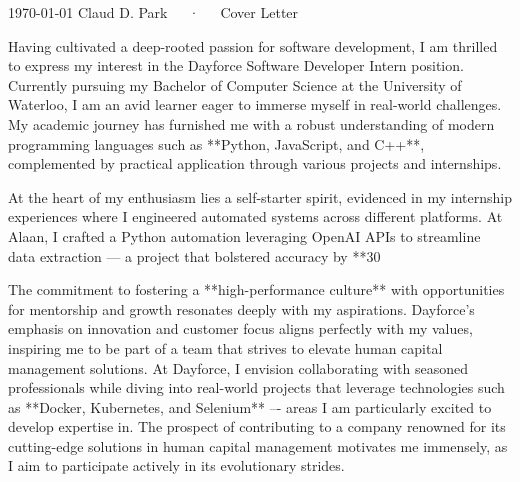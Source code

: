 \documentclass[11pt, a4paper]{awesome-cv}
\begin{document}
\makecvheader[C]

\makecvfooter
  {\today}
  {Claud D. Park~~~·~~~Cover Letter}
  {}

\makelettertitle

\begin{cvletter}

Having cultivated a deep-rooted passion for software development, I am thrilled to express my interest in the Dayforce Software Developer Intern position. Currently pursuing my Bachelor of Computer Science at the University of Waterloo, I am an avid learner eager to immerse myself in real-world challenges. My academic journey has furnished me with a robust understanding of modern programming languages such as **Python, JavaScript, and C++**, complemented by practical application through various projects and internships.

At the heart of my enthusiasm lies a self-starter spirit, evidenced in my internship experiences where I engineered automated systems across different platforms. At Alaan, I crafted a Python automation leveraging OpenAI APIs to streamline data extraction — a project that bolstered accuracy by **30%

The commitment to fostering a **high-performance culture** with opportunities for mentorship and growth resonates deeply with my aspirations. Dayforce's emphasis on innovation and customer focus aligns perfectly with my values, inspiring me to be part of a team that strives to elevate human capital management solutions. At Dayforce, I envision collaborating with seasoned professionals while diving into real-world projects that leverage technologies such as **Docker, Kubernetes, and Selenium** –- areas I am particularly excited to develop expertise in. The prospect of contributing to a company renowned for its cutting-edge solutions in human capital management motivates me immensely, as I aim to participate actively in its evolutionary strides.


\end{cvletter}
\end{document}
